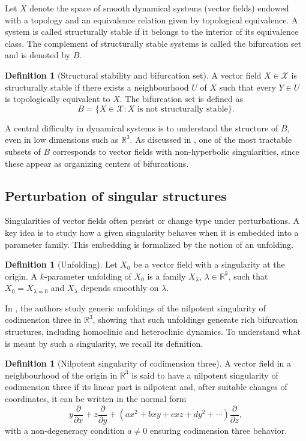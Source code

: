 \documentclass[12pt, a4paper, oneside]{book}
\theoremstyle{plain}
\theoremstyle{definition}
\newtheorem{definition}[theorem]{Definition}
\theoremstyle{remark}
\theoremstyle{definition}
\begin{document}
Let $X$ denote the space of smooth dynamical systems (vector fields) endowed with a
topology and an equivalence relation given by topological equivalence. A system is called
structurally stable if it belongs to the interior of its equivalence class. The
complement of structurally stable systems is called the bifurcation set and is denoted by
$B$.

\begin{definition}[Structural stability and bifurcation set]
A vector field $X \in \mathcal{X}$ is structurally stable if there exists a neighbourhood
$U$ of $X$ such that every $Y \in U$ is topologically equivalent to $X$. The bifurcation
set is defined as
\[
B = \{ X \in \mathcal{X} : X \text{ is not structurally stable} \}.
\]
\end{definition}

A central difficulty in dynamical systems is to understand the structure of $B$, even in
low dimensions such as $\mathbb{R}^3$. As discussed in \cite{ibanez2005shil}, one of the
most tractable subsets of $B$ corresponds to vector fields with non-hyperbolic
singularities, since these appear as organizing centers of bifurcations.

\subsection{Perturbation of singular structures}

Singularities of vector fields often persist or change type under perturbations. A key
idea is to study how a given singularity behaves when it is embedded into a parameter
family. This embedding is formalized by the notion of an unfolding.

\begin{definition}[Unfolding]
Let $X_0$ be a vector field with a singularity at the origin. A $k$-parameter unfolding
of $X_0$ is a family $X_\lambda$, $\lambda \in \mathbb{R}^k$, such that $X_0 =
X_{\lambda=0}$ and $X_\lambda$ depends smoothly on $\lambda$.
\end{definition}

In \cite{ibanez2005shil}, the authors study generic unfoldings of the nilpotent
singularity of codimension three in $\mathbb{R}^3$, showing that such unfoldings generate
rich bifurcation structures, including homoclinic and heteroclinic dynamics. To understand
what is meant by such a singularity, we recall its definition.

\begin{definition}[Nilpotent singularity of codimension three]
A vector field in a neighbourhood of the origin in $\mathbb{R}^3$ is said to have a
nilpotent singularity of codimension three if its linear part is nilpotent and, after
suitable changes of coordinates, it can be written in the normal form
\[
y\frac{\partial}{\partial x} + z\frac{\partial}{\partial y} + \left( ax^2 + bxy + cxz +
dy^2 + \cdots \right)\frac{\partial}{\partial z},
\]
with a non-degeneracy condition $a \neq 0$ ensuring codimension three behavior.
\end{definition}
\end{document}
